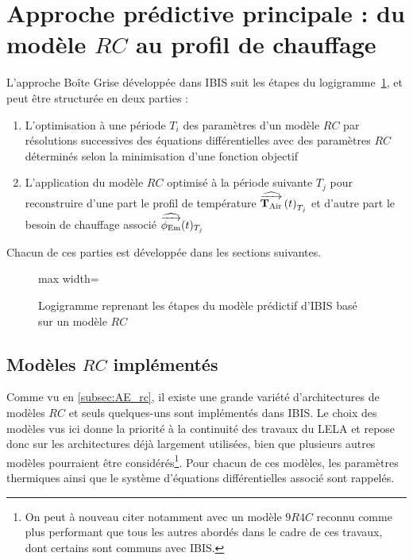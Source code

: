 \section{Approche prédictive principale : du modèle $RC$ au profil de chauffage}\label{sec:approche-predictive-principale-:-du-modele-$rc$-au-profil-de-chauffage}
    L'approche Boîte Grise développée dans IBIS suit les étapes du logigramme~\ref{fig:logigramme1}, et peut être structurée en deux parties :
    \begin{enumerate}
        \item L'optimisation à une période $T_i$ des paramètres d'un modèle $RC$ par résolutions successives des équations différentielles avec des paramètres $RC$ déterminés selon la minimisation d'une fonction objectif
        \item L'application du modèle $RC$ optimisé à la période suivante $T_j$ pour reconstruire d'une part le profil de température $\operatorname{\widehat{\overrightarrow{\mathbf{T}_{\text{Air}}}}}\left(t\right)_{T_j}$ et d'autre part le besoin de chauffage associé $\operatorname{\widehat{\overrightarrow{\phi_{\text{Em}}}}}(t)_{T_j}$
    \end{enumerate}

    Chacun de ces parties est développée dans les sections suivantes.
    \begin{center}
        \begin{figure}[H]
            \centering
            \begin{adjustbox}{max width=\linewidth}
                \fbox{}
            \end{adjustbox}
            \caption{Logigramme reprenant les étapes du modèle prédictif d'IBIS basé sur un modèle $RC$}\label{fig:logigramme1}
        \end{figure}
    \end{center}

    \subsection{Modèles $RC$ implémentés}\label{subsec:modeles-rc-implementes}
        Comme vu en \ref{subsec:AE_rc}, il existe une grande variété d'architectures de modèles $RC$ et seuls quelques-uns sont implémentés dans IBIS\@.
        Le choix des modèles vus ici donne la priorité à la continuité des travaux du LELA et repose donc sur les architectures déjà largement utilisées, bien que plusieurs autres modèles pourraient être considérés\footnote{On peut à nouveau citer \cite{scanu} notamment avec un modèle $9R4C$ reconnu comme plus performant que tous les autres abordés dans le cadre de ces travaux, dont certains sont communs avec IBIS.}.
        Pour chacun de ces modèles, les paramètres thermiques ainsi que le système d'équations différentielles associé sont rappelés.
